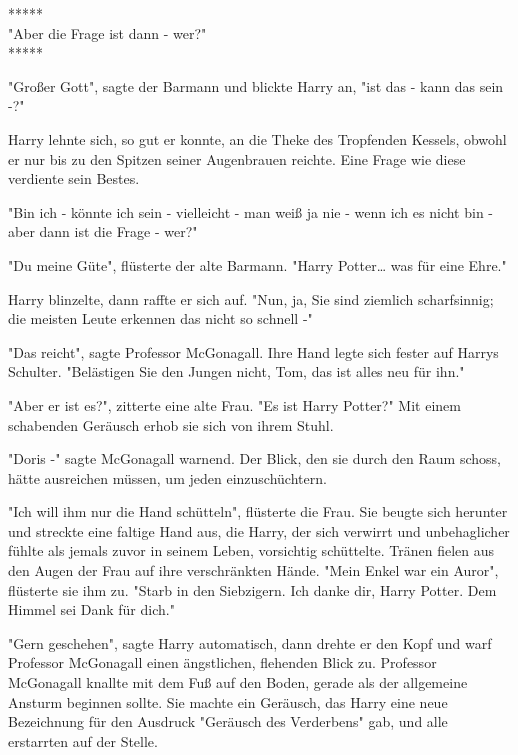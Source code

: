 

\hypertarget{die-realituxe4t-mit-ihren-alternativen-vergleichen}{%

*****\\ "Aber die Frage ist dann - wer?" ~\\ *****

"Großer Gott", sagte der Barmann und blickte Harry an, "ist das - kann das sein -?"

Harry lehnte sich, so gut er konnte, an die Theke des Tropfenden Kessels, obwohl er nur bis zu den Spitzen seiner Augenbrauen reichte. Eine Frage wie diese verdiente sein Bestes.

"Bin ich - könnte ich sein - vielleicht - man weiß ja nie - wenn ich es nicht bin - aber dann ist die Frage - wer?"

"Du meine Güte", flüsterte der alte Barmann. "Harry Potter… was für eine Ehre."

Harry blinzelte, dann raffte er sich auf. "Nun, ja, Sie sind ziemlich scharfsinnig; die meisten Leute erkennen das nicht so schnell -"

"Das reicht", sagte Professor McGonagall. Ihre Hand legte sich fester auf Harrys Schulter. "Belästigen Sie den Jungen nicht, Tom, das ist alles neu für ihn."

"Aber er ist es?", zitterte eine alte Frau. "Es ist Harry Potter?" Mit einem schabenden Geräusch erhob sie sich von ihrem Stuhl.

"Doris -" sagte McGonagall warnend. Der Blick, den sie durch den Raum schoss, hätte ausreichen müssen, um jeden einzuschüchtern.

"Ich will ihm nur die Hand schütteln", flüsterte die Frau. Sie beugte sich herunter und streckte eine faltige Hand aus, die Harry, der sich verwirrt und unbehaglicher fühlte als jemals zuvor in seinem Leben, vorsichtig schüttelte. Tränen fielen aus den Augen der Frau auf ihre verschränkten Hände. "Mein Enkel war ein Auror", flüsterte sie ihm zu. "Starb in den Siebzigern. Ich danke dir, Harry Potter. Dem Himmel sei Dank für dich."

"Gern geschehen", sagte Harry automatisch, dann drehte er den Kopf und warf Professor McGonagall einen ängstlichen, flehenden Blick zu. Professor McGonagall knallte mit dem Fuß auf den Boden, gerade als der allgemeine Ansturm beginnen sollte. Sie machte ein Geräusch, das Harry eine neue Bezeichnung für den Ausdruck "Geräusch des Verderbens" gab, und alle erstarrten auf der Stelle.

}
